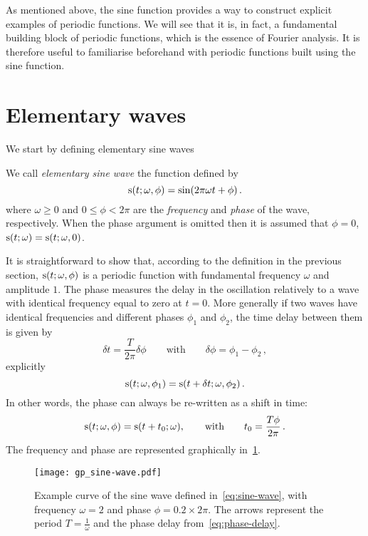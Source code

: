 As mentioned above, the sine function provides a way to construct explicit examples of
periodic functions. We will see that it is, in fact, a fundamental building block of
periodic functions, which is the essence of Fourier analysis. It is therefore useful to
familiarise beforehand with periodic functions built using the sine function.
\section{Elementary waves}
We start by defining elementary sine waves
\begin{definition}
  We call \emph{elementary sine wave} the function defined by
  \begin{equation}
    \mathrm{s}(t;\omega,\phi)=\sin(2\pi\omega t + \phi)\,.\label{eq:sine-wave}
  \end{equation}
  where $\omega\geq 0$ and $0\leq\phi<2\pi$ are the \emph{frequency} and \emph{phase} of
  the wave, respectively. When the phase argument is omitted then it is assumed that
  $\phi=0$, \ie $\mathrm{s}(t;\omega)=\mathrm{s}(t;\omega,0)$.
\end{definition}
\noindent It is straightforward to show that, according to the definition in the previous
section, $\mathrm{s}(t;\omega,\phi)$ is a periodic function with fundamental frequency $\omega$
and amplitude $1$. The phase measures the delay in the oscillation relatively to a wave
with identical frequency equal to zero at $t=0$. More generally if two waves have
identical frequencies and different phases $\phi_1$ and $\phi_2$, the time delay between
them is given by
\begin{equation}
  \delta t =\frac{T}{2\pi}\delta\phi\qquad\text{with}\qquad\delta\phi=\phi_1-\phi_2\,,
\end{equation}
explicitly
\begin{equation}
  \mathrm{s}(t;\omega,\phi_1)=\mathrm{s}(t+\delta t;\omega,\phi_2)\,.
\end{equation}
In other words, the phase can always be re-written as a shift in time:
\begin{equation}
  \mathrm{s}(t;\omega,\phi)=\mathrm{s}(t+t_0;\omega),
  \qquad\text{with}\qquad
  t_0 = \frac{T\phi}{2\pi}\,.\label{eq:phase-delay}
\end{equation}
The frequency and phase are represented graphically in~\cref{fig:sine-wave}.
\begin{figure}[t]
  \centering
  \texttt{[image: gp\_sine-wave.pdf]}
  \caption{Example curve of the sine wave defined in~\cref{eq:sine-wave}, with frequency $\omega=2$ and phase $\phi=0.2\times 2\pi$. The arrows represent the period $T=\frac{1}{\omega}$ and the phase delay from~\cref{eq:phase-delay}.}
  \label{fig:sine-wave}
\end{figure}

